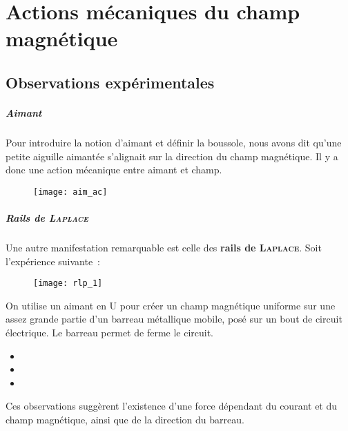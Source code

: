 \documentclass[../main/main.tex]{subfiles}
\begin{document}
\setcounter{chapter}{1}

\chapter{Actions mécaniques du champ magnétique}
\label{ch:ind_meca}
\section{Observations expérimentales}
\label{sec:obsexp}
\paragraph*{Aimant}
Pour introduire la notion d'aimant et définir la boussole, nous avons dit qu'une
petite aiguille aimantée s'alignait sur la direction du champ magnétique. Il y a
donc une action mécanique entre aimant et champ.

\begin{figure}[h]
  \centering
  \texttt{[image: aim\_ac]}
  \label{fig:aim_ac}
\end{figure}

\paragraph*{Rails de \textsc{Laplace}}
Une autre manifestation remarquable est celle des \textbf{rails de
\textsc{Laplace}}. Soit l'expérience suivante~:
\begin{figure}[h]
  \centering
  \texttt{[image: rlp\_1]}
  \label{fig:rlp_1}
\end{figure}
On utilise un aimant en U pour créer un champ magnétique uniforme sur une assez
grande partie d'un barreau métallique mobile, posé sur un bout de circuit
électrique. Le barreau permet de ferme le circuit.
\begin{itemize}[label=$\diamond$, leftmargin=10pt]
  \item {}
  \item {}
  \item {}
\end{itemize}
Ces observations suggèrent l'existence d'une force dépendant du courant et du
champ magnétique, ainsi que de la direction du barreau.
\end{document}
